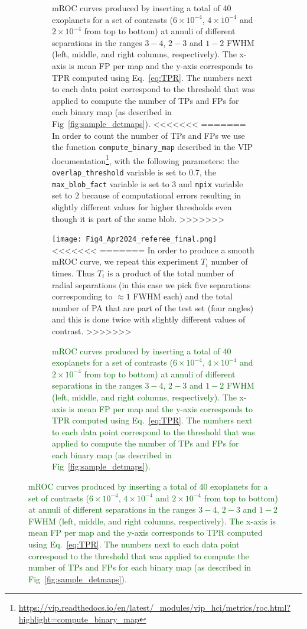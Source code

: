 \documentclass{aa}
\newcommand{\newchange}[1]{\textcolor{darkgreen}{#1}}
\begin{document}
{{{\begin{figure}[t]
{\begin{figure}
{{}}
\caption{ mROC curves produced by inserting a total of 40 exoplanets for a set of contrasts ($6 \times 10^{-4}$, $4 \times 10^{-4}$ and $2 \times 10^{-4}$ from top to bottom) at annuli of different separations in the ranges $3-4$, $2-3$ and $1-2$ FWHM (left, middle, and right columns, respectively).
The x-axis is mean FP per map and the y-axis corresponds to TPR computed using Eq.~\ref{eq:TPR}. 
The numbers next to each data point correspond to the threshold that was applied to compute the number of TPs and FPs for each binary map (as described in Fig~\ref{fig:sample_detmaps}).
<<<<<<<
=======
In order to count the number of TPs and FPs we use the function \texttt{compute\_binary\_map} described in the VIP documentation\footnote{\url{https://vip.readthedocs.io/en/latest/_modules/vip_hci/metrics/roc.html?highlight=compute_binary_map}}, with the following parameters: the \texttt{overlap\_threshold} variable is set to $0.7$, the \texttt{max\_blob\_fact} variable is set to $3$ and \texttt{npix} variable set to $2$ because of computational errors resulting in slightly different values for higher thresholds even though it is part of the same blob.
>>>>>>>
}
\end{figure}
\begin{figure}
\centering
    \texttt{[image: Fig4\_Apr2024\_referee\_final.png]}
<<<<<<<
=======
In order to produce a smooth mROC curve, we repeat this experiment $T_{i}$ number of times.
Thus $T_{i}$ is a product of the total number of radial separations (in this case we pick five separations corresponding to $\approx 1$ FWHM each) and the total number of PA that are part of the test set (four angles) and this is done twice with slightly different values of contrast.
>>>>>>>
\caption{ \newchange{mROC curves produced by inserting a total of 40 exoplanets for a set of contrasts ($6 \times 10^{-4}$, $4 \times 10^{-4}$ and $2 \times 10^{-4}$ from top to bottom) at annuli of different separations in the ranges $3-4$, $2-3$ and $1-2$ FWHM (left, middle, and right columns, respectively).
The x-axis is mean FP per map and the y-axis corresponds to TPR computed using Eq.~\ref{eq:TPR}. 
The numbers next to each data point correspond to the threshold that was applied to compute the number of TPs and FPs for each binary map (as described in Fig~\ref{fig:sample_detmaps}).
}}
    \label{fig:fig_4}
\end{figure}

}
\end{figure}}}}
\end{document}
